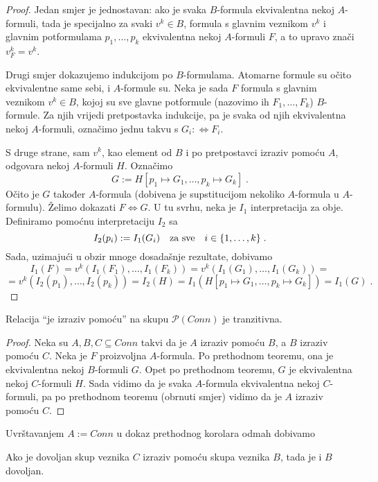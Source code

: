 \begin{proof}
	Jedan smjer je jednostavan: ako je svaka $B$-formula ekvivalentna nekoj $A$-formuli, tada je specijalno za svaki $v^k\in B$, formula s glavnim veznikom $v^k$ i glavnim potformulama $p_1,\ldots,p_k$ ekvivalentna nekoj $A$-formuli $F$, a to upravo znači $v^k_F=v^k$.
	
	Drugi smjer dokazujemo indukcijom po $B$-formulama. Atomarne formule su očito ekvivalentne same sebi, i $A$-formule su. Neka je sada $F$ formula s glavnim veznikom $v^k\in B$, kojoj su sve glavne potformule (nazovimo ih $F_1,\ldots,F_k$) $B$-formule. Za njih vrijedi pretpostavka indukcije, pa je svaka od njih ekvivalentna nekoj $A$-formuli, označimo jednu takvu s $G_i:\Leftrightarrow F_i$.
	
	S druge strane, sam $v^k$, kao element od $B$ i po pretpostavci izraziv pomoću $A$, odgovara nekoj $A$-formuli $H$. Označimo $$G:=H[p_1\mapsto G_1,\ldots,p_k\mapsto G_k]\;.$$
	Očito je $G$ također $A$-formula (dobivena je supstitucijom nekoliko $A$-formula u $A$-formulu). Želimo dokazati $F\Leftrightarrow G$. U tu svrhu, neka je $I_1$ interpretacija za obje. Definiramo pomoćnu interpretaciju $I_2$ sa
	$$I_2(p_i):=I_1(G_i)\mbox{\quad za sve\quad}i\in\{1,\ldots,k\}\;.$$
	Sada, uzimajući u obzir mnoge dosadašnje rezultate, dobivamo
	$$I_1(F)=v^k(I_1(F_1),\ldots,I_1(F_k))=v^k(I_1(G_1),\ldots,I_1(G_k))=$$
	$$=v^k(I_2(p_1),\ldots,I_2(p_k))=I_2(H)=I_1(H[p_1\mapsto G_1,\ldots,p_k\mapsto G_k])=I_1(G)\;.$$
\end{proof}

\begin{korolar}
	Relacija ``je izraziv pomoću'' na skupu $\mathcal P(Conn)$ je tranzitivna.
\end{korolar}

\begin{proof}
	Neka su $A, B, C\subseteq Conn$ takvi da je $A$ izraziv pomoću $B$, a $B$ izraziv pomoću $C$. Neka je $F$ proizvoljna $A$-formula. Po prethodnom teoremu, ona je ekvivalentna nekoj $B$-formuli $G$. Opet po prethodnom teoremu, $G$ je ekvivalentna nekoj $C$-formuli $H$. Sada vidimo da je svaka $A$-formula ekvivalentna nekoj $C$-formuli, pa po prethodnom teoremu (obrnuti smjer) vidimo da je $A$ izraziv pomoću $C$.
\end{proof}

Uvrštavanjem $A:=Conn$ u dokaz prethodnog korolara odmah dobivamo

\begin{korolar}
	Ako je dovoljan skup veznika $C$ izraziv pomoću skupa veznika $B$, tada je i $B$ dovoljan.
\end{korolar}


